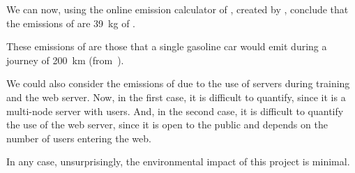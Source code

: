 We can now, using the online emission calculator of , created by
, conclude that the emissions of  are
\SI{39}{\kg} of .

\begin{exampleBox}
  These emissions of  are those that a single gasoline car would emit
  during a journey of \SI{200}{\km} (from~\cite{aragon21:emiss_calcul}).
\end{exampleBox}

We could also consider the emissions of  due to the use of servers
during training and the web server. Now, in the first case, it is difficult to
quantify, since it is a multi-node server with users. And, in the second case,
it is difficult to quantify the use of the web server, since it is open to the
public and depends on the number of users entering the web.

In any case, unsurprisingly, the environmental impact of this project is
minimal.